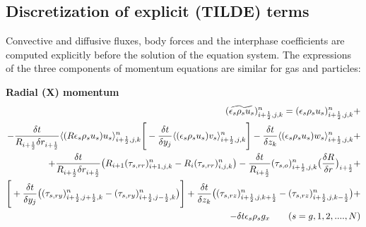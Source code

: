 \subsection{Discretization of  explicit (TILDE) terms}
Convective and diffusive fluxes, body forces and the interphase coefficients
are computed explicitly before the solution of the equation system. 
The expressions of the three components of momentum equations are similar
for gas and particles:

{\bf Radial (X) momentum}\\
%
\begin{eqnarray}
\htmlimage{}
(\widetilde{\epsilon_s \rho_s u_s})_{i+\frac{1}{2},j,k}^{n} =
(\epsilon_s \rho_s u_s)_{i+\frac{1}{2},j,k}^{n} 
+ \nonumber \\
- \frac{\delta t}{R_{i+\frac{1}{2}} \delta r_{i+\frac{1}{2}}} 
\langle (R \epsilon_s \rho_s u_s) u_s \rangle_{i+\frac{1}{2},j,k}^{n} 
\Bigg[
- \frac{\delta t} {\delta y_j} 
\langle (\epsilon_s \rho_s u_s) v_s \rangle_{i+\frac{1}{2},j,k}^{n}
\Bigg]
- \frac{\delta t} {\delta z_k} 
\langle (\epsilon_s \rho_s u_s) w_s \rangle_{i+\frac{1}{2},j,k}^{n} 
+ \nonumber \\
+ \frac{\delta t} {R_{i+\frac{1}{2}} \delta r_{i+\frac{1}{2}}} 
\big(R_{i+1}(\tau_{s,rr})_{i+1,j,k}^{n} - R_i (\tau_{s,rr})_{i,j,k}^{n} \big) 
- \frac{\delta t} {R_{i+\frac{1}{2}}}
(\tau_{s,o})_{i+\frac{1}{2},j,k}^{n} 
\big( \frac{\delta R}{\delta r} \big)_{i+\frac{1}{2}}
+ \nonumber \\
\Bigg[
+ \frac{\delta t} {\delta y_j} 
\big( (\tau_{s,ry})_{i+\frac{1}{2},j+\frac{1}{2},k}^{n} - 
(\tau_{s,ry})_{i+\frac{1}{2},j-\frac{1}{2},k}^{n} \big)
\Bigg]
+\frac{\delta t} {\delta z_k} 
\big( (\tau_{s,rz})_{i+\frac{1}{2},j,k+\frac{1}{2}}^{n} - 
(\tau_{s,rz})_{i+\frac{1}{2},j,k-\frac{1}{2}}^{n} \big) 
+ \nonumber \\
-\delta t \epsilon_s \rho_s g_x
\qquad (s=g,1,2, ....,N)
\nonumber
\end{eqnarray}

